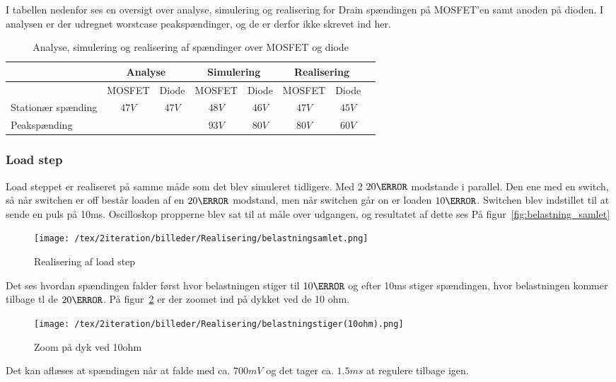 I tabellen nedenfor ses en oversigt over analyse, simulering og realisering for Drain spændingen på MOSFET'en samt anoden på dioden. I analysen er der udregnet worstcase peakspændinger, og de er derfor ikke skrevet ind her. 

\begin{table}[H] 			
	\centering
	\begin{tabularx}{\textwidth}{|X|c|c|c|c|c|c|c}
		\hline
		 & \multicolumn{2}{|X|}{\textbf{Analyse}} & \multicolumn{2}{|X|}{\textbf{Simulering}} & \multicolumn{2}{|X|}{\textbf{Realisering}} \\ \hline
		& MOSFET & Diode & MOSFET & Diode & MOSFET & Diode \\ \hline
		Stationær spænding & $47V$ & $47V$ & $48V$ & $46V$ & $47V$ & $45V$ \\ \hline
		Peakspænding &  &  & $93V$ & $80V$ & $80V$ & $60V$ \\ \hline
	\end{tabularx}
	\caption{Analyse, simulering og realisering af spændinger over MOSFET og diode}
	\label{tab:MOSDIODE}
\end{table}

\subsubsection{Load step}
Load steppet er realiseret på samme måde som det blev simuleret tidligere. Med 2 $20\ohm$ modstande i parallel. Den ene med en switch, så når switchen er off består loaden af en $20\ohm$ modstand, men når switchen går on er loaden $10\ohm$. Switchen blev indstillet til at sende en puls på 10ms. Oscilloskop propperne blev sat til at måle over udgangen, og resultatet af dette ses På figur~\ref{fig:belastning_samlet} 
\begin{figure}[H]
	\center
	\texttt{[image: /tex/2iteration/billeder/Realisering/belastningsamlet.png]}
	\caption{Realisering af load step}
	\label{fig:belastningsamlet}
\end{figure}
Det ses hvordan spændingen falder først hvor belastningen stiger til $10\ohm$ og efter 10ms stiger spændingen, hvor belastningen kommer tilbage tl de $20\ohm$. På figur~\ref{fig:belastning_10ohm} er der zoomet ind på dykket ved de 10 ohm. 
\begin{figure}[H]
	\center
	\texttt{[image: /tex/2iteration/billeder/Realisering/belastningstiger(10ohm).png]}
	\caption{Zoom på dyk ved 10ohm}
	\label{fig:belastning_10ohm}
\end{figure}
Det kan aflæses at spændingen når at falde med ca. $700mV$ og det tager ca. $1.5ms$ at regulere tilbage igen.

